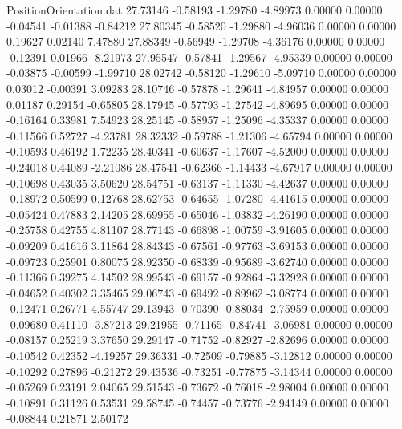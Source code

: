 \begin{filecontents}{PositionOrientation.dat}
  27.73146   -0.58193   -1.29780    -4.89973    0.00000    0.00000   -0.04541   -0.01388   -0.84212
  27.80345   -0.58520   -1.29880    -4.96036    0.00000    0.00000    0.19627    0.02140    7.47880
  27.88349   -0.56949   -1.29708    -4.36176    0.00000    0.00000   -0.12391    0.01966   -8.21973
  27.95547   -0.57841   -1.29567    -4.95339    0.00000    0.00000   -0.03875   -0.00599   -1.99710
  28.02742   -0.58120   -1.29610    -5.09710    0.00000    0.00000    0.03012   -0.00391    3.09283
  28.10746   -0.57878   -1.29641    -4.84957    0.00000    0.00000    0.01187    0.29154   -0.65805
  28.17945   -0.57793   -1.27542    -4.89695    0.00000    0.00000   -0.16164    0.33981    7.54923
  28.25145   -0.58957   -1.25096    -4.35337    0.00000    0.00000   -0.11566    0.52727   -4.23781
  28.32332   -0.59788   -1.21306    -4.65794    0.00000    0.00000   -0.10593    0.46192    1.72235
  28.40341   -0.60637   -1.17607    -4.52000    0.00000    0.00000   -0.24018    0.44089   -2.21086
  28.47541   -0.62366   -1.14433    -4.67917    0.00000    0.00000   -0.10698    0.43035    3.50620
  28.54751   -0.63137   -1.11330    -4.42637    0.00000    0.00000   -0.18972    0.50599    0.12768
  28.62753   -0.64655   -1.07280    -4.41615    0.00000    0.00000   -0.05424    0.47883    2.14205
  28.69955   -0.65046   -1.03832    -4.26190    0.00000    0.00000   -0.25758    0.42755    4.81107
  28.77143   -0.66898   -1.00759    -3.91605    0.00000    0.00000   -0.09209    0.41616    3.11864
  28.84343   -0.67561   -0.97763    -3.69153    0.00000    0.00000   -0.09723    0.25901    0.80075
  28.92350   -0.68339   -0.95689    -3.62740    0.00000    0.00000   -0.11366    0.39275    4.14502
  28.99543   -0.69157   -0.92864    -3.32928    0.00000    0.00000   -0.04652    0.40302    3.35465
  29.06743   -0.69492   -0.89962    -3.08774    0.00000    0.00000   -0.12471    0.26771    4.55747
  29.13943   -0.70390   -0.88034    -2.75959    0.00000    0.00000   -0.09680    0.41110   -3.87213
  29.21955   -0.71165   -0.84741    -3.06981    0.00000    0.00000   -0.08157    0.25219    3.37650
  29.29147   -0.71752   -0.82927    -2.82696    0.00000    0.00000   -0.10542    0.42352   -4.19257
  29.36331   -0.72509   -0.79885    -3.12812    0.00000    0.00000   -0.10292    0.27896   -0.21272
  29.43536   -0.73251   -0.77875    -3.14344    0.00000    0.00000   -0.05269    0.23191    2.04065
  29.51543   -0.73672   -0.76018    -2.98004    0.00000    0.00000   -0.10891    0.31126    0.53531
  29.58745   -0.74457   -0.73776    -2.94149    0.00000    0.00000   -0.08844    0.21871    2.50172

\end{filecontents}

